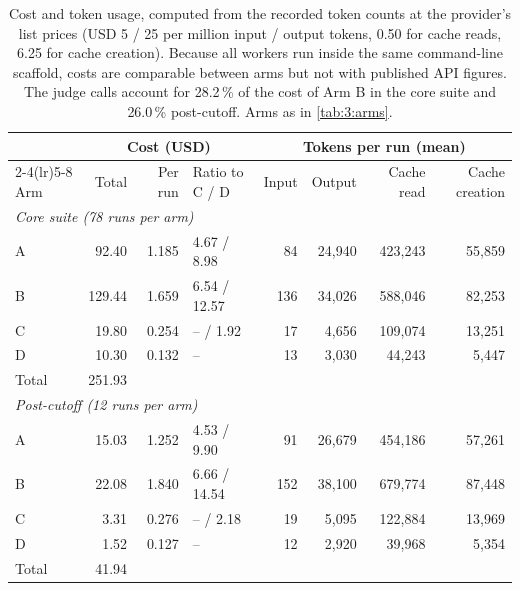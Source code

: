 \begin{table}[htbp]
  \centering
  \small
  \caption[Cost and token usage]{Cost and token usage, computed from the recorded token counts at the provider's list prices (USD 5 / 25 per million input / output tokens, 0.50 for cache reads, 6.25 for cache creation). Because all workers run inside the same command-line scaffold, costs are comparable between arms but not with published API figures. The judge calls account for 28.2\,\% of the cost of Arm B in the core suite and 26.0\,\% post-cutoff. Arms as in \autoref{tab:3:arms}.}
  \label{tab:6:cost}
  \begin{tabular}{lrrlrrrr}
    \toprule
     & \multicolumn{3}{c}{Cost (USD)} & \multicolumn{4}{c}{Tokens per run (mean)} \\
    \cmidrule(lr){2-4}\cmidrule(lr){5-8}
    Arm & Total & Per run & Ratio to C / D & Input & Output & Cache read & Cache creation \\
    \midrule
    \multicolumn{8}{l}{\emph{Core suite (78 runs per arm)}} \\
    \quad A & 92.40 & 1.185 & 4.67 / 8.98 & 84 & 24,940 & 423,243 & 55,859 \\
    \quad B & 129.44 & 1.659 & 6.54 / 12.57 & 136 & 34,026 & 588,046 & 82,253 \\
    \quad C & 19.80 & 0.254 & -- / 1.92 & 17 & 4,656 & 109,074 & 13,251 \\
    \quad D & 10.30 & 0.132 & -- & 13 & 3,030 & 44,243 & 5,447 \\
    \quad Total & 251.93 &  &  &  &  &  &  \\
    \midrule
    \multicolumn{8}{l}{\emph{Post-cutoff (12 runs per arm)}} \\
    \quad A & 15.03 & 1.252 & 4.53 / 9.90 & 91 & 26,679 & 454,186 & 57,261 \\
    \quad B & 22.08 & 1.840 & 6.66 / 14.54 & 152 & 38,100 & 679,774 & 87,448 \\
    \quad C & 3.31 & 0.276 & -- / 2.18 & 19 & 5,095 & 122,884 & 13,969 \\
    \quad D & 1.52 & 0.127 & -- & 12 & 2,920 & 39,968 & 5,354 \\
    \quad Total & 41.94 &  &  &  &  &  &  \\
    \bottomrule
  \end{tabular}
\end{table}
